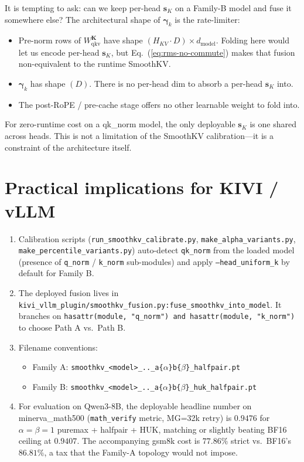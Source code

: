 \documentclass[11pt]{article}
\newcommand{\sk}{\mathbf{s}_K}
\newcommand{\K}{\mathbf{K}}
\begin{document}
It is tempting to ask: can we keep per-head $\sk$ on a Family-B model and
fuse it somewhere else? The architectural shape of $\boldsymbol{\gamma}_k$
is the rate-limiter:
\begin{itemize}
  \item Pre-norm rows of $W_{\mathrm{qkv}}^{\K}$ have shape
    $(H_{KV} \cdot D)\times d_{\mathrm{model}}$. Folding here would let us
    encode per-head $\sk$, but Eq.~(\ref{eq:rms-no-commute}) makes that
    fusion non-equivalent to the runtime SmoothKV.
  \item $\boldsymbol{\gamma}_k$ has shape $(D)$. There is no per-head dim
    to absorb a per-head $\sk$ into.
  \item The post-RoPE / pre-cache stage offers no other learnable weight
    to fold into.
\end{itemize}
For zero-runtime cost on a qk\_norm model, the only deployable
$\sk$ is one shared across heads. This is not a limitation of the
SmoothKV calibration---it is a constraint of the architecture itself.

\section{Practical implications for KIVI / vLLM}

\begin{enumerate}
  \item Calibration scripts (\texttt{run\_smoothkv\_calibrate.py},
    \texttt{make\_alpha\_variants.py}, \texttt{make\_percentile\_variants.py})
    auto-detect \texttt{qk\_norm} from the loaded model (presence of
    \texttt{q\_norm} / \texttt{k\_norm} sub-modules) and apply
    \texttt{--head\_uniform\_k} by default for Family B.
  \item The deployed fusion lives in
    \texttt{kivi\_vllm\_plugin/smoothkv\_fusion.py:fuse\_smoothkv\_into\_model}.
    It branches on \texttt{hasattr(module, "q\_norm") and hasattr(module,
    "k\_norm")} to choose Path A vs.\ Path B.
  \item Filename conventions:
    \begin{itemize}
      \item Family A: \texttt{smoothkv\_<model>\_..\_a\{$\alpha$\}b\{$\beta$\}\_halfpair.pt}
      \item Family B: \texttt{smoothkv\_<model>\_..\_a\{$\alpha$\}b\{$\beta$\}\_huk\_halfpair.pt}
    \end{itemize}
  \item For evaluation on Qwen3-8B, the deployable headline number on
    minerva\_math500 (\texttt{math\_verify} metric, MG=32k retry) is
    $0.9476$ for $\alpha\!=\!\beta\!=\!1$ puremax + halfpair + HUK,
    matching or slightly beating BF16 ceiling at $0.9407$. The
    accompanying gsm8k cost is $77.86\%$ strict vs.\ BF16's $86.81\%$,
    a tax that the Family-A topology would not impose.
\end{enumerate}
\end{document}

